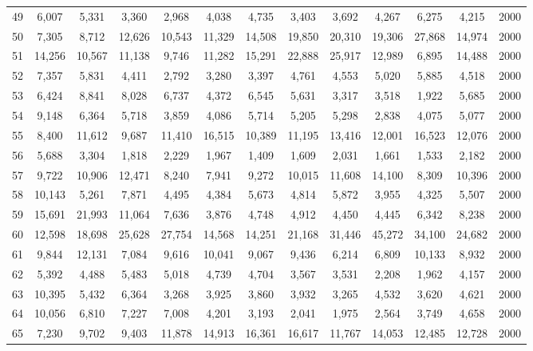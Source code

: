 {\begin{longtable}{ >{\footnotesize}ccccccccccccc}
49  & 6,007  & 5,331  & 3,360  & 2,968  & 4,038  & 4,735  & 3,403  & 3,692  & 4,267  & 6,275  & 4,215  & 2000 \\
50  & 7,305  & 8,712  & 12,626 & 10,543 & 11,329 & 14,508 & 19,850 & 20,310 & 19,306 & 27,868 & 14,974 & 2000 \\
51  & 14,256 & 10,567 & 11,138 & 9,746  & 11,282 & 15,291 & 22,888 & 25,917 & 12,989 & 6,895  & 14,488 & 2000 \\
52  & 7,357  & 5,831  & 4,411  & 2,792  & 3,280  & 3,397  & 4,761  & 4,553  & 5,020  & 5,885  & 4,518  & 2000 \\
53  & 6,424  & 8,841  & 8,028  & 6,737  & 4,372  & 6,545  & 5,631  & 3,317  & 3,518  & 1,922  & 5,685  & 2000 \\
54  & 9,148  & 6,364  & 5,718  & 3,859  & 4,086  & 5,714  & 5,205  & 5,298  & 2,838  & 4,075  & 5,077  & 2000 \\
55  & 8,400  & 11,612 & 9,687  & 11,410 & 16,515 & 10,389 & 11,195 & 13,416 & 12,001 & 16,523 & 12,076 & 2000 \\
56  & 5,688  & 3,304  & 1,818  & 2,229  & 1,967  & 1,409  & 1,609  & 2,031  & 1,661  & 1,533  & 2,182  & 2000 \\
57  & 9,722  & 10,906 & 12,471 & 8,240  & 7,941  & 9,272  & 10,015 & 11,608 & 14,100 & 8,309  & 10,396 & 2000 \\
58  & 10,143 & 5,261  & 7,871  & 4,495  & 4,384  & 5,673  & 4,814  & 5,872  & 3,955  & 4,325  & 5,507  & 2000 \\
59  & 15,691 & 21,993 & 11,064 & 7,636  & 3,876  & 4,748  & 4,912  & 4,450  & 4,445  & 6,342  & 8,238  & 2000 \\
60  & 12,598 & 18,698 & 25,628 & 27,754 & 14,568 & 14,251 & 21,168 & 31,446 & 45,272 & 34,100 & 24,682 & 2000 \\
61  & 9,844  & 12,131 & 7,084  & 9,616  & 10,041 & 9,067  & 9,436  & 6,214  & 6,809  & 10,133 & 8,932  & 2000 \\
62  & 5,392  & 4,488  & 5,483  & 5,018  & 4,739  & 4,704  & 3,567  & 3,531  & 2,208  & 1,962  & 4,157  & 2000 \\
63  & 10,395 & 5,432  & 6,364  & 3,268  & 3,925  & 3,860  & 3,932  & 3,265  & 4,532  & 3,620  & 4,621  & 2000 \\
64  & 10,056 & 6,810  & 7,227  & 7,008  & 4,201  & 3,193  & 2,041  & 1,975  & 2,564  & 3,749  & 4,658  & 2000 \\
65  & 7,230  & 9,702  & 9,403  & 11,878 & 14,913 & 16,361 & 16,617 & 11,767 & 14,053 & 12,485 & 12,728 & 2000 \\

\end{longtable}}
